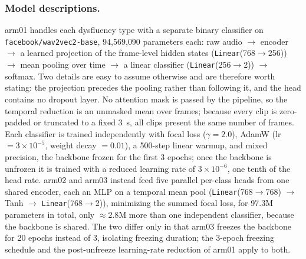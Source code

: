 \documentclass[a4paper,orivec]{llncs}
\begin{document}
\subsubsection{Model descriptions.}
arm01 handles each dysfluency type with a separate binary classifier on
\texttt{facebook/wav2vec2-base}, 94{,}569{,}090 parameters each: raw audio
$\rightarrow$ encoder $\rightarrow$ a learned projection of the frame-level hidden
states (\texttt{Linear}(768$\rightarrow$256)) $\rightarrow$ mean pooling over time
$\rightarrow$ a linear classifier (\texttt{Linear}(256$\rightarrow$2)) $\rightarrow$
softmax. Two details are easy to assume otherwise and are therefore worth stating:
the projection precedes the pooling rather than following it, and the head contains
no dropout layer. No attention mask is passed by the pipeline, so the temporal
reduction is an unmasked mean over frames; because every clip is zero-padded or
truncated to a fixed 3~s, all clips present the same number of frames. Each
classifier is trained independently with focal loss ($\gamma = 2.0$), AdamW
(lr $= 3\times10^{-5}$, weight decay $= 0.01$), a 500-step linear warmup, and
mixed precision, the backbone frozen for the first 3 epochs; once the backbone is
unfrozen it is trained with a reduced learning rate of $3\times10^{-6}$, one tenth
of the head rate. arm02 and arm03 instead feed five parallel per-class
heads from one shared encoder, each an MLP on a temporal mean pool
(\texttt{Linear}(768$\rightarrow$768) $\rightarrow$ Tanh $\rightarrow$
\texttt{Linear}(768$\rightarrow$2)), minimizing the summed focal loss, for 97.3M
parameters in total, only ${\approx}2.8$M more than one independent classifier,
because the backbone is shared. The two differ only in that arm03 freezes the
backbone for 20 epochs instead of 3, isolating freezing duration; the 3-epoch
freezing schedule and the post-unfreeze learning-rate reduction of arm01 apply to
both.
\end{document}
